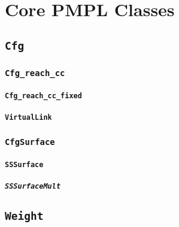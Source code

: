 \chapter{Core PMPL Classes}

\section{\texttt{Cfg}}

\subsection{\texttt{Cfg\_reach\_cc}}

\subsubsection{\texttt{Cfg\_reach\_cc\_fixed}}

\subsubsection{\texttt{VirtualLink}}

\subsection{\texttt{CfgSurface}}

\subsubsection{\texttt{SSSurface}}

\paragraph{\texttt{SSSurfaceMult}}

\section{\texttt{Weight}}

